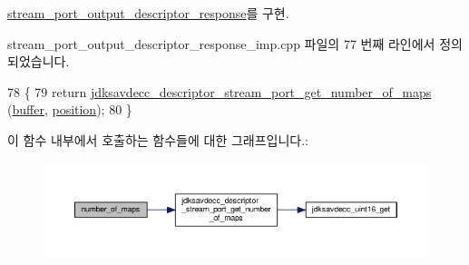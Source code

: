 \hyperlink{classavdecc__lib_1_1stream__port__output__descriptor__response_acda32e14eb207ebd11856fab5172173c}{stream\+\_\+port\+\_\+output\+\_\+descriptor\+\_\+response}를 구현.



stream\+\_\+port\+\_\+output\+\_\+descriptor\+\_\+response\+\_\+imp.\+cpp 파일의 77 번째 라인에서 정의되었습니다.


\begin{DoxyCode}
78 \{
79     \textcolor{keywordflow}{return} \hyperlink{group__descriptor__stream__port_gaf9d286bd9ce8e7bcd8e0fc37d7a776ad}{jdksavdecc\_descriptor\_stream\_port\_get\_number\_of\_maps}
      (\hyperlink{classavdecc__lib_1_1descriptor__response__base__imp_a56ed84df35de10bdb65e72b184309497}{buffer}, \hyperlink{classavdecc__lib_1_1descriptor__response__base__imp_a7a04afe5347934be732ec70a70bd0a28}{position});
80 \}
\end{DoxyCode}


이 함수 내부에서 호출하는 함수들에 대한 그래프입니다.\+:
\nopagebreak
\begin{figure}[H]
\begin{center}
\leavevmode
\includegraphics[width=350pt]{classavdecc__lib_1_1stream__port__output__descriptor__response__imp_a05d30e1a63b1459efaacfc203df1c9d7_cgraph}
\end{center}
\end{figure}


